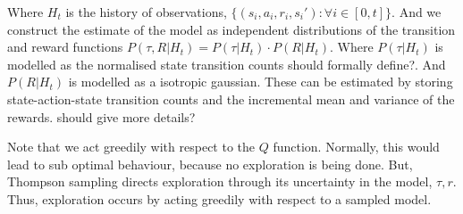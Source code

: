 Where $H_t$ is the history of observations, $\{(s_i, a_i, r_i, s_i') : \forall i \in [0, t]\}$.
And we construct the estimate of the model as independent distributions of the transition and reward functions $P(\tau, R | H_t) = P(\tau | H_t) \cdot P(R | H_t)$. Where $P(\tau | H_t)$
is modelled as the normalised state transition counts {\color{red}should formally define?}.
And $P(R | H_t)$ is modelled as a isotropic gaussian.
These can be estimated by storing state-action-state transition counts
and the incremental mean and variance of the rewards. {\color{red}should give more details?}

Note that we act greedily with respect to the $Q$ function. Normally, this would
lead to sub optimal behaviour, because no exploration is being done. But, Thompson sampling
directs exploration through its uncertainty in the model, $\tau, r$. Thus,
exploration occurs by acting greedily with respect to a sampled model.


